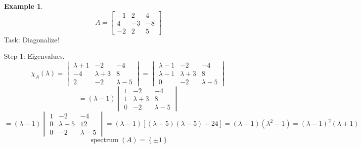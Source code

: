 \documentclass[a4paper,landscape,twocolumn]{article}
\newcommand\set[1]{\left\{#1\right\}}
\theoremstyle{definition}
\newtheorem{ex}{Example}
\DeclareMathOperator\spec{spectrum}
\begin{document}
\begin{ex}
  \label{bsp-10.16}
  \[
    A = \begin{bmatrix}
      -1 & 2 & 4 \\
      4 & -3 & -8 \\
      -2 & 2 & 5
    \end{bmatrix}
  \]
  Task: Diagonalize!

  Step 1: Eigenvalues.
  \[
    \chi_A(\lambda) =
    \begin{vmatrix}
      \lambda + 1 & -2 & -4 \\
      -4 & \lambda + 3 & 8 \\
      2 & -2 & \lambda - 5
    \end{vmatrix}
    = \begin{vmatrix}
      \lambda - 1 & -2 & -4 \\
      \lambda - 1 & \lambda + 3 & 8 \\
      0 & -2 & \lambda-5
    \end{vmatrix}
  \] \[
    = (\lambda - 1) \begin{vmatrix}
      1 & -2 & -4 \\
      1 & \lambda + 3 & 8 \\
      0 & -2 & \lambda - 5
    \end{vmatrix}
  \] \[
    = (\lambda - 1) \begin{vmatrix}
      1 & -2 & -4 \\
      0 & \lambda+5 & 12 \\
      0 & -2 & \lambda-5
    \end{vmatrix}
    = (\lambda - 1) \left[
      (\lambda + 5)(\lambda - 5) + 24
    \right]
    = (\lambda - 1)(\lambda^2 - 1)
    = (\lambda - 1)^2 (\lambda + 1)
  \] \[
    \spec(A) = \set{\pm1}
  \]


\end{ex}
\end{document}
